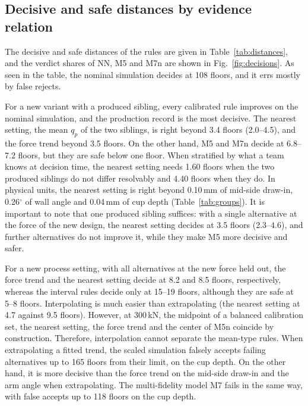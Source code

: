 \documentclass[pdflatex,sn-basic,lineno]{sn-jnl}
\begin{document}
\subsection{Decisive and safe distances by evidence relation}\label{sec:res-decisions}

The decisive and safe distances of the rules are given in Table~\ref{tab:distances}, and the verdict shares of NN, M5 and M7n are shown in Fig.~\ref{fig:decisions}. As seen in the table, the nominal simulation decides at 108 floors, and it errs mostly by false rejects.

For a new variant with a produced sibling, every calibrated rule improves on the nominal simulation, and the production record is the most decisive. The nearest setting, the mean $q_p$ of the two siblings, is right beyond 3.4 floors (2.0--4.5), and the force trend beyond 3.5 floors. On the other hand, M5 and M7n decide at 6.8--7.2 floors, but they are safe below one floor. When stratified by what a team knows at decision time, the nearest setting needs 1.60 floors when the two produced siblings do not differ resolvably and 4.40 floors when they do. In physical units, the nearest setting is right beyond 0.10\,mm of mid-side draw-in, 0.26$^\circ$ of wall angle and 0.04\,mm of cup depth (Table~\ref{tab:groups}). It is important to note that one produced sibling suffices: with a single alternative at the force of the new design, the nearest setting decides at 3.5 floors (2.3--4.6), and further alternatives do not improve it, while they make M5 more decisive and safer.

For a new process setting, with all alternatives at the new force held out, the force trend and the nearest setting decide at 8.2 and 8.5 floors, respectively, whereas the interval rules decide only at 15--19 floors, although they are safe at 5--8 floors. Interpolating is much easier than extrapolating (the nearest setting at 4.7 against 9.5 floors). However, at 300\,kN, the midpoint of a balanced calibration set, the nearest setting, the force trend and the center of M5n coincide by construction. Therefore, interpolation cannot separate the mean-type rules. When extrapolating a fitted trend, the scaled simulation falsely accepts failing alternatives up to 165 floors from their limit, on the cup depth. On the other hand, it is more decisive than the force trend on the mid-side draw-in and the arm angle when extrapolating. The multi-fidelity model M7 fails in the same way, with false accepts up to 118 floors on the cup depth.
\end{document}

